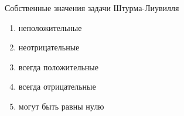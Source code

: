 Собственные значения задачи Штурма-Лиувилля

\begin{enumerate}[label=\arabic*)]
    \item неположительные
    \item неотрицательные
    \item всегда положительные
    \item всегда отрицательные
    \item могут быть равны нулю
\end{enumerate}

